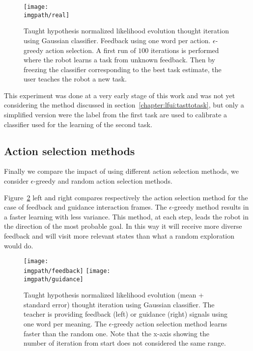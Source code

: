 \begin{figure}[!ht]
  \centering
  \texttt{[image: \\imgpath/real]}
  \caption{Taught hypothesis normalized likelihood evolution thought iteration using Gaussian classifier.  Feedback using one word per action. $\epsilon$-greedy action selection. A first run of $100$ iterations is performed where the robot learns a task from unknown feedback. Then by freezing the classifier corresponding to the best task estimate, the user teaches the robot a new task.}
  \label{fig:Real}
\end{figure}

This experiment was done at a very early stage of this work and was not yet considering the method discussed in section~\ref{chapter:lfui:tasttotask}, but only a simplified version were the label from the first task are used to calibrate a classifier used for the learning of the second task.

\subsection{Action selection methods}

Finally we compare the impact of using different action selection methods, we consider $\epsilon$-greedy and random action selection methods.

Figure~\ref{fig:selectionMethod} left and right compares respectively the action selection method for the case of feedback and guidance interaction frames. The $\epsilon$-greedy method results in a faster learning with less variance. This method, at each step, leads the robot in the direction of the most probable goal. In this way it will receive more diverse feedback and will visit more relevant states than what a random exploration would do.

\begin{figure}[!ht]
  \centering
  \texttt{[image: \\imgpath/feedback]}
  \texttt{[image: \\imgpath/guidance]}
  \caption{Taught hypothesis normalized likelihood evolution (mean + standard error) thought iteration using Gaussian classifier. The teacher is providing feedback (left) or guidance (right) signals using one word per meaning. The $\epsilon$-greedy action selection method learns faster than the random one. Note that the x-axis showing the number of iteration from start does not considered the same range.}
  \label{fig:selectionMethod}
\end{figure}


